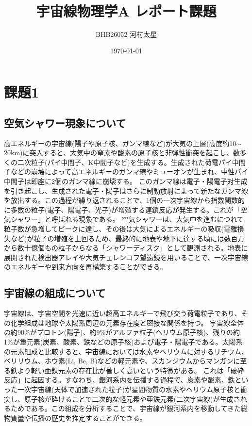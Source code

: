 \documentclass[a4paper,11pt]{jsarticle}
\title{宇宙線物理学A レポート課題}
\author{BHB26052 河村太星}
\date{\today}
\begin{document}
\maketitle

\section*{課題1}

\subsection*{空気シャワー現象について}
高エネルギーの宇宙線(陽子や原子核、ガンマ線など)が大気の上層(高度約10$\sim$20km)に突入すると、大気中の窒素や酸素の原子核と非弾性衝突を起こし、数多くの二次粒子(パイ中間子、K中間子など)を生成する。生成された荷電パイ中間子などの崩壊によって高エネルギーのガンマ線やミューオンが生まれ、中性パイ中間子は即座に2個のガンマ線に崩壊する。
このガンマ線は電子・陽電子対生成を引き起こし、生成された電子・陽子はさらに制動放射によって新たなガンマ線を放出する。この過程が繰り返されることで、1個の一次宇宙線から指数関数的に多数の粒子(電子、陽電子、光子)が増殖する連鎖反応が発生する。これが「空気シャワー」と呼ばれる現象である。
空気シャワーは、大気中を進むにつれて粒子数が急増してピークに達し、その後は大気によるエネルギーの吸収(電離損失など)が粒子の増殖を上回るため、最終的に地表や地下に達する頃には数百万から数十億個もの粒子からなる「シャワーディスク」として観測される。地表に展開された検出器アレイや大気チェレンコフ望遠鏡を用いることで、一次宇宙線のエネルギーや到来方向を再構築することができる。

\subsection*{宇宙線の組成について}
宇宙線は、宇宙空間を光速に近い超高エネルギーで飛び交う荷電粒子であり、その化学組成は地球や太陽系周辺の元素存在度と密接な関係を持つ。
宇宙線全体の約90\%がプロトン(陽子)、約9\%がアルファ粒子(ヘリウム原子核)、残りの約1\%が重元素(炭素、酸素、鉄などの原子核)および電子・陽電子である。太陽系の元素組成と比較すると、宇宙線においては水素やヘリウムに対するリチウム、ベリリウム、ホウ素(Li, Be, B)などの軽元素や、スカンジウムからマンガンに至る鉄より軽い亜鉄元素の存在比が著しく高いという特徴がある。
これは「破砕反応」に起因する。すなわち、銀河系内を伝播する過程で、炭素や酸素、鉄といった一次宇宙線(天体で加速された粒子)が星間物質の水素やヘリウム原子核と衝突し、原子核が砕けることで二次的な軽元素や亜鉄元素(二次宇宙線)が生成されるためである。この組成を分析することで、宇宙線が銀河系内を移動してきた総物質量や伝播の歴史を推定することができる。
\end{document}
